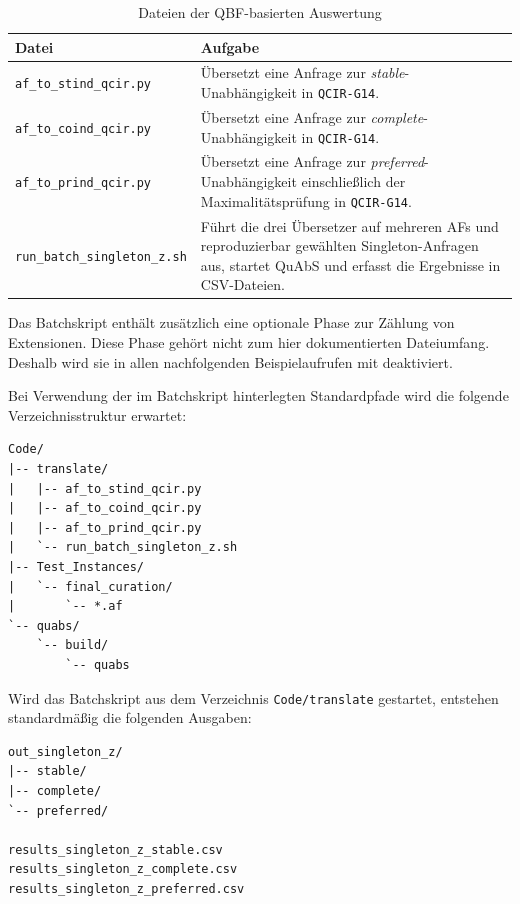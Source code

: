 \begin{table}[htb]
    \centering
    \begin{tabularx}{\textwidth}{@{}lX@{}}
        \toprule
        Datei & Aufgabe\\
        \midrule
        \texttt{af\_to\_stind\_qcir.py}
            & Übersetzt eine Anfrage zur
              \emph{stable}-Unabhängigkeit in \texttt{QCIR-G14}.\\
        \texttt{af\_to\_coind\_qcir.py}
            & Übersetzt eine Anfrage zur
              \emph{complete}-Unabhängigkeit in \texttt{QCIR-G14}.\\
        \texttt{af\_to\_prind\_qcir.py}
            & Übersetzt eine Anfrage zur
              \emph{preferred}-Unabhängigkeit einschließlich der
              Maximalitätsprüfung in \texttt{QCIR-G14}.\\
        \texttt{run\_batch\_singleton\_z.sh}
            & Führt die drei Übersetzer auf mehreren AFs und
              reproduzierbar gewählten Singleton-Anfragen aus, startet
              QuAbS und erfasst die Ergebnisse in CSV-Dateien.\\
        \bottomrule
    \end{tabularx}
    \caption{Dateien der QBF-basierten Auswertung}
    \label{tab:appendix-qbf-files}
\end{table}
Das Batchskript enthält zusätzlich eine optionale Phase zur Zählung von
Extensionen. Diese Phase gehört nicht zum hier dokumentierten
Dateiumfang. Deshalb wird sie in allen nachfolgenden Beispielaufrufen
mit  deaktiviert.

Bei Verwendung der im Batchskript hinterlegten Standardpfade wird die
folgende Verzeichnisstruktur erwartet:
\begin{lstlisting}[language={}]
Code/
|-- translate/
|   |-- af_to_stind_qcir.py
|   |-- af_to_coind_qcir.py
|   |-- af_to_prind_qcir.py
|   `-- run_batch_singleton_z.sh
|-- Test_Instances/
|   `-- final_curation/
|       `-- *.af
`-- quabs/
    `-- build/
        `-- quabs
\end{lstlisting}

Wird das Batchskript aus dem Verzeichnis
\texttt{Code/translate} gestartet, entstehen standardmäßig die
folgenden Ausgaben:
\begin{lstlisting}[language={}]
out_singleton_z/
|-- stable/
|-- complete/
`-- preferred/

results_singleton_z_stable.csv
results_singleton_z_complete.csv
results_singleton_z_preferred.csv
\end{lstlisting}

